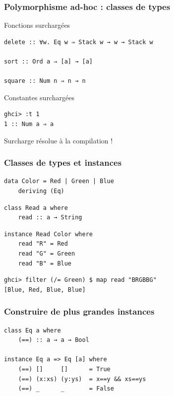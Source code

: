 \documentclass[10pt]{beamer}
\begin{document}
\begin{frame}[fragile]
\frametitle{Polymorphisme ad-hoc : classes de types}
\begin{block}
{Fonctions surchargées}
\begin{verbatim}
delete :: ∀w. Eq w ⇒ Stack w → w → Stack w

sort :: Ord a ⇒ [a] → [a]

square :: Num n ⇒ n → n
\end{verbatim}
\end{block}
\pause
\begin{block}
{Constantes surchargées}
\begin{verbatim}
ghci> :t 1
1 :: Num a ⇒ a
\end{verbatim}
\end{block}
\pause
Surcharge résolue à la compilation !
\end{frame}



\begin{frame}[fragile]
\frametitle{Classes de types et instances}
\begin{verbatim}
data Color = Red | Green | Blue
    deriving (Eq)
\end{verbatim}

\begin{verbatim}
class Read a where
    read :: a → String
\end{verbatim}
\pause
\begin{verbatim}
instance Read Color where
    read "R" = Red
    read "G" = Green
    read "B" = Blue
\end{verbatim}
\pause
\begin{verbatim}
ghci> filter (/= Green) $ map read "BRGBBG"
[Blue, Red, Blue, Blue]
\end{verbatim}
\end{frame}



\begin{frame}[fragile]
\frametitle{Construire de plus grandes instances}
\begin{verbatim}
class Eq a where
    (==) :: a → a → Bool

instance Eq a => Eq [a] where
    (==) []     []      = True
    (==) (x:xs) (y:ys)  = x==y && xs==ys
    (==) _      _       = False
\end{verbatim}
\end{frame}
\end{document}
